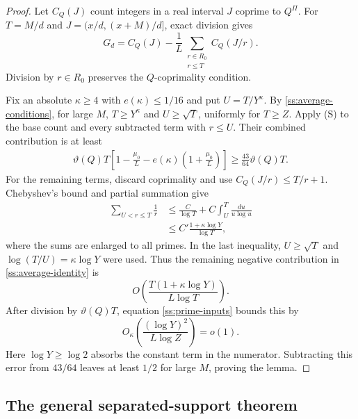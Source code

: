 \begin{proof}
Let $C_Q(J)$ count integers in a real interval $J$ coprime to $Q^\Pi$.
For $T=M/d$ and $J=(x/d,(x+M)/d]$, exact division gives
\begin{equation}
 G_d=C_Q(J)-\frac1L
      \sum_{\substack{r\in R_0\\r\le T}}C_Q(J/r).
 \label{ss:average-identity}
\end{equation}
Division by $r\in R_0$ preserves the $Q$-coprimality condition.

Fix an absolute $\kappa\ge4$ with $e(\kappa)\le1/16$ and put
$U=T/Y^\kappa$. By \eqref{ss:average-conditions}, for large $M$,
$T\ge Y^\kappa$ and $U\ge\sqrt T$, uniformly for $T\ge Z$.
Apply (S) to the base count and every subtracted term with $r\le U$.
Their combined contribution is at least
\[
 \begin{split}
 \vartheta(Q)T\left[
  1-\frac{\mu_0}{L}
       -e(\kappa)\left(1+\frac{\mu_0}{L}\right)\right]
 \ge\frac{43}{64}\vartheta(Q)T.
 \end{split}
\]
For the remaining terms, discard coprimality and use
$C_Q(J/r)\le T/r+1$. Chebyshev's bound and partial summation give
\[
 \begin{split}
 \sum_{U<r\le T}\frac1r
 &\le\frac C{\log T}
       +C\int_U^T\frac{du}{u\log u}\\
 &\le C'\frac{1+\kappa\log Y}{\log T},
 \end{split}
\]
where the sums are enlarged to all primes. In the last inequality,
$U\ge\sqrt T$ and $\log(T/U)=\kappa\log Y$ were used.
Thus the remaining negative contribution in
\eqref{ss:average-identity} is
\[
 O\left(\frac{T(1+\kappa\log Y)}{L\log T}\right).
 \]
After division by $\vartheta(Q)T$, equation
\eqref{ss:prime-inputs} bounds this by
\[
 O_\kappa\left(\frac{(\log Y)^2}{L\log Z}\right)=o(1).
 \]
Here $\log Y\ge\log2$ absorbs the constant term in the numerator.
Subtracting this error from $43/64$ leaves at least $1/2$ for large
$M$, proving the lemma.
\end{proof}

\subsection{The general separated-support theorem}

